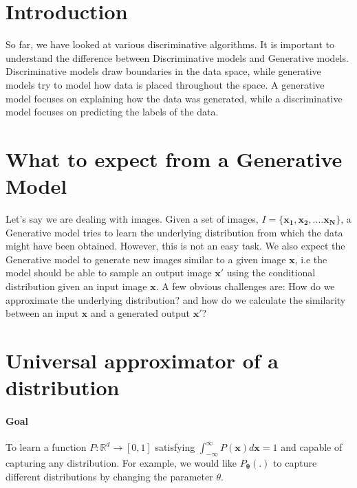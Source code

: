 \documentclass[12pt]{article}
\begin{document}
	\MakeScribeTop


\section{Introduction}
So far, we have looked at various discriminative algorithms. It is important to understand the difference between Discriminative models and Generative models. Discriminative models draw boundaries in the data space, while generative models try to model how data is placed throughout the space. A generative model focuses on explaining how the data was generated, while a discriminative model focuses on predicting the labels of the data.

\section{What to expect from a Generative Model}
Let's say we are dealing with images. Given a set of images, $I = \{\mathbf{x_{1}, x_{2}, ....x_{N}}\}$, a Generative model tries to learn the underlying distribution from which the data might have been obtained. However, this is not an easy task. We also expect the Generative model to generate new images similar to a given image $\mathbf{x}$, i.e the model should be able to sample an output image $\mathbf{x'}$ using the conditional distribution given an input image $\mathbf{x}$. A few obvious challenges are: How do we approximate the underlying distribution? and how do we calculate the similarity between an input $\mathbf{x}$ and a generated output $\mathbf{x'}$?

\section{Universal approximator of a distribution}
\paragraph{Goal} To learn a function $P:\mathbb{R}^{d} \rightarrow [0, 1]$ satisfying $\int_{-\infty}^{\infty}{P(\mathbf{x})}d\mathbf{x} = 1$ and capable of capturing any distribution. For example, we would like $P_{\mathbf{\theta}}(.)$ to capture different distributions by changing the parameter $\theta$.
\end{document}
